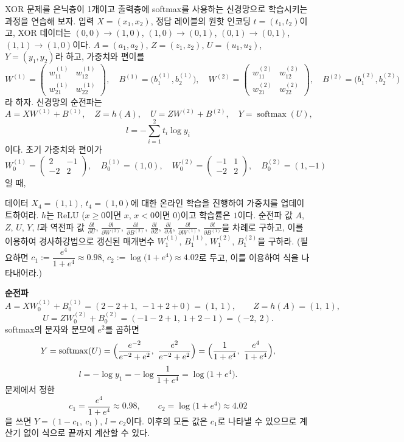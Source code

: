 \documentclass[11pt,a4paper]{article}
\newcommand{\pd}[2]{\frac{\partial #1}{\partial #2}}
\newcommand{\softmax}{\operatorname{softmax}}
\begin{document}
\begin{problems}
\item

XOR 문제를 은닉층이 1개이고 출력층에 softmax를 사용하는 신경망으로 학습시키는 과정을 연습해 보자.
입력 $X=(x_1,x_2)$, 정답 레이블의 원핫 인코딩 $t=(t_1,t_2)$이고, XOR 데이터는
$(0,0)\to(1,0)$, $(1,0)\to(0,1)$, $(0,1)\to(0,1)$, $(1,1)\to(1,0)$이다.
$A=(a_1,a_2)$, $Z=(z_1,z_2)$, $U=(u_1,u_2)$, $Y=(y_1,y_2)$라 하고, 가중치와 편이를
\[
W^{(1)}=\begin{pmatrix}w^{(1)}_{11}&w^{(1)}_{12}\\ w^{(1)}_{21}&w^{(1)}_{22}\end{pmatrix},\quad
B^{(1)}=\bigl(b^{(1)}_1,b^{(1)}_2\bigr),\quad
W^{(2)}=\begin{pmatrix}w^{(2)}_{11}&w^{(2)}_{12}\\ w^{(2)}_{21}&w^{(2)}_{22}\end{pmatrix},\quad
B^{(2)}=\bigl(b^{(2)}_1,b^{(2)}_2\bigr)
\]
라 하자. 신경망의 순전파는
\[
A=XW^{(1)}+B^{(1)},\quad Z=h(A),\quad U=ZW^{(2)}+B^{(2)},\quad Y=\softmax(U),
\]
\[
l=-\sum_{i=1}^{2}t_i\log y_i
\]
이다. 초기 가중치와 편이가
\[
W^{(1)}_0=\begin{pmatrix}2&-1\\-2&2\end{pmatrix},\quad
B^{(1)}_0=(1,0),\quad
W^{(2)}_0=\begin{pmatrix}-1&1\\-2&2\end{pmatrix},\quad
B^{(2)}_0=(1,-1)
\]
일 때,

데이터 $X_4=(1,1)$, $t_4=(1,0)$에 대한 온라인 학습을 진행하여 가중치를 업데이트하여라.
$h$는 ReLU ($x\ge0$이면 $x$, $x<0$이면 $0$)이고 학습률은 $1$이다.
순전파 값 $A$, $Z$, $U$, $Y$, $l$과 역전파 값 $\pd{l}{U}$, $\pd{l}{W^{(2)}}$, $\pd{l}{B^{(2)}}$, $\pd{l}{Z}$, $\pd{l}{A}$,
$\pd{l}{W^{(1)}}$, $\pd{l}{B^{(1)}}$을 차례로 구하고,
이를 이용하여 경사하강법으로 갱신된 매개변수 $W^{(1)}_1$, $B^{(1)}_1$, $W^{(2)}_1$, $B^{(2)}_1$을 구하라.
(필요하면 $c_1:=\dfrac{e^{4}}{1+e^{4}}\approx0.98$, $c_2:=\log\bigl(1+e^{4}\bigr)\approx4.02$로 두고, 이를 이용하여 식을 나타내어라.)

\begin{solbox}
\textbf{순전파}
\[
A=XW^{(1)}_0+B^{(1)}_0=(2-2+1,\ -1+2+0)=(1,\ 1),
\qquad
Z=h(A)=(1,\ 1),
\]
\[
U=ZW^{(2)}_0+B^{(2)}_0=(-1-2+1,\ 1+2-1)=(-2,\ 2).
\]
softmax의 분자와 분모에 $e^{2}$를 곱하면
\[
Y=\softmax(U)=\Bigl(\frac{e^{-2}}{e^{-2}+e^{2}},\ \frac{e^{2}}{e^{-2}+e^{2}}\Bigr)
=\Bigl(\frac{1}{1+e^{4}},\ \frac{e^{4}}{1+e^{4}}\Bigr),
\]
\[
l=-\log y_1=-\log\frac{1}{1+e^{4}}=\log\bigl(1+e^{4}\bigr).
\]
문제에서 정한
\[
c_1=\frac{e^{4}}{1+e^{4}}\approx0.98,
\qquad
c_2=\log\bigl(1+e^{4}\bigr)\approx4.02
\]
을 쓰면 $Y=(1-c_1,\ c_1)$, $l=c_2$이다. 이후의 모든 값은 $c_1$로 나타낼 수 있으므로 계산기 없이 식으로 끝까지 계산할 수 있다.


\end{solbox}
\end{problems}
\end{document}
